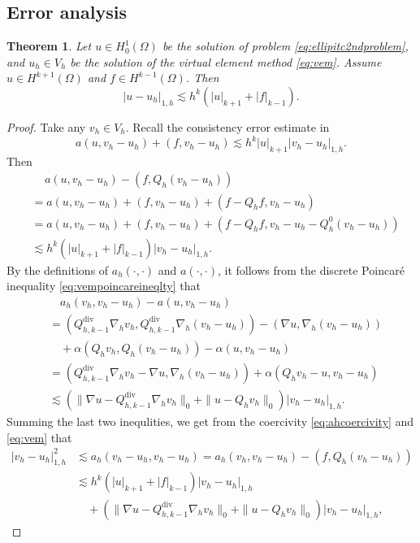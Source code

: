 \documentclass[10pt]{amsart}
\newtheorem{theorem}{Theorem}[section]
\renewcommand{\div}{\operatorname{div}}
\numberwithin{equation}{section}
\begin{document}
\subsection{Error analysis}
\begin{theorem}\label{thm:errorestimateH1}
Let $u\in H_0^1(\Omega)$ be the solution of problem \eqref{eq:ellipitc2ndproblem}, and $u_h\in V_h$ be the solution of the virtual element method \eqref{eq:vem}. Assume $u\in H^{k+1}(\Omega)$ and $f\in H^{k-1}(\Omega)$. Then
\begin{equation}\label{eq:errorestimateH1}
|u-u_h|_{1,h}\lesssim h^k(|u|_{k+1}+|f|_{k-1}).
\end{equation}
\end{theorem}
\begin{proof}
Take any $v_h\in V_h$. Recall the consistency error estimate in \cite[Lemma 5.5]{ChenHuang2020ncvem}
$$
a(u,v_h-u_h)+(f, v_h-u_h)\lesssim h^k|u|_{k+1}|v_h-u_h|_{1,h}.
$$
Then 
\begin{align*}
&\quad \,a(u,v_h-u_h)-(f, Q_h(v_h-u_h)) \\
&=a(u,v_h-u_h)+(f, v_h-u_h)+(f-Q_hf, v_h-u_h) \\
&=a(u,v_h-u_h)+(f, v_h-u_h)+(f-Q_hf, v_h-u_h-Q_h^0(v_h-u_h)) \\
&\lesssim h^k(|u|_{k+1}+|f|_{k-1})|v_h-u_h|_{1,h}.
\end{align*}
By the definitions of $a_h(\cdot, \cdot)$ and $a(\cdot, \cdot)$, it follows from the discrete Poincar\'e inequality \eqref{eq:vempoincareineqlty} that
\begin{align*}
&\quad a_h(v_h, v_h-u_h)-a(u,v_h-u_h)\\
&=(Q_{h,k-1}^{\div}\nabla_h v_h, Q_{h,k-1}^{\div}\nabla_h(v_h-u_h))-(\nabla u, \nabla_h(v_h-u_h))\\
&\quad +\alpha(Q_hv_h, Q_h(v_h-u_h))-\alpha(u, v_h-u_h) \\
&=(Q_{h,k-1}^{\div}\nabla_h v_h-\nabla u, \nabla_h(v_h-u_h))+\alpha(Q_hv_h-u,v_h-u_h)\\
&\lesssim (\|\nabla u-Q_{h,k-1}^{\div}\nabla_h v_h\|_0+\|u-Q_hv_h\|_0)|v_h-u_h|_{1,h}.
\end{align*}
Summing the last two inequlities, we get from the coercivity \eqref{eq:ahcoercivity} and \eqref{eq:vem} that
\begin{align*}
|v_h-u_h|_{1,h}^2&\lesssim a_h(v_h-u_h, v_h-u_h)=a_h(v_h, v_h-u_h)-(f, Q_h(v_h-u_h)) \\
&\lesssim h^k(|u|_{k+1}+|f|_{k-1})|v_h-u_h|_{1,h} \\
&\quad + (\|\nabla u-Q_{h,k-1}^{\div}\nabla_h v_h\|_0+\|u-Q_hv_h\|_0)|v_h-u_h|_{1,h},

\end{align*}
\end{proof}
\end{document}
